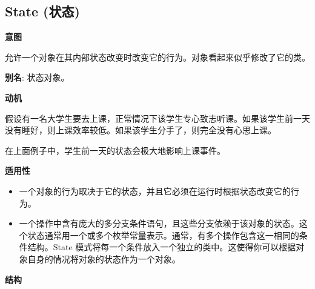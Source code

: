 \subsection{State (状态)}

\noindent\textbf{意图}

允许一个对象在其内部状态改变时改变它的行为。对象看起来似乎修改了它的类。

\textbf{别名}: 状态对象。

\noindent\textbf{动机}

假设有一名大学生要去上课，正常情况下该学生专心致志听课。如果该学生前一天没有睡好，则上课效率较低。如果该学生分手了，则完全没有心思上课。

在上面例子中，学生前一天的状态会极大地影响上课事件。

\noindent\textbf{适用性}

\begin{itemize}
    \item 一个对象的行为取决于它的状态，并且它必须在运行时根据状态改变它的行为。
    \item 一个操作中含有庞大的多分支条件语句，且这些分支依赖于该对象的状态。这个状态通常用一个或多个枚举常量表示。通常，有多个操作包含这一相同的条件结构。State 模式将每一个条件放入一个独立的类中。这使得你可以根据对象自身的情况将对象的状态作为一个对象。
\end{itemize}

\noindent\textbf{结构}

\begin{figure}[H]
    \scriptsize
    \centering
\end{figure}

